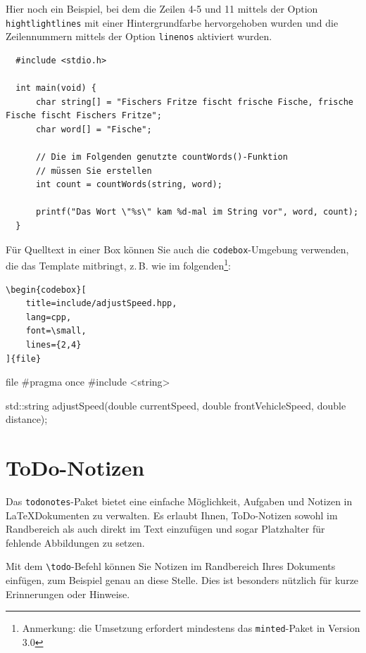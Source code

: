 Hier noch ein Beispiel, bei dem die Zeilen 4-5 und 11 mittels der Option
\texttt{hightlightlines} mit einer Hintergrundfarbe hervorgehoben wurden und die
Zeilennummern mittels der Option \texttt{linenos} aktiviert wurden.


\begin{verbatim}
  #include <stdio.h>
  
  int main(void) {
      char string[] = "Fischers Fritze fischt frische Fische, frische Fische fischt Fischers Fritze";
      char word[] = "Fische";
  
      // Die im Folgenden genutzte countWords()-Funktion
      // müssen Sie erstellen
      int count = countWords(string, word);
  
      printf("Das Wort \"%s\" kam %d-mal im String vor", word, count);
  }
\end{verbatim}

Für Quelltext in einer Box können Sie auch die \texttt{codebox}-Umgebung
verwenden, die das Template mitbringt, z.\,B. wie im
folgenden\footnote{Anmerkung: die Umsetzung erfordert mindestens das
\texttt{minted}-Paket in Version 3.0}:

\begin{verbatim}
\begin{codebox}[
    title=include/adjustSpeed.hpp,
    lang=cpp,
    font=\small,
    lines={2,4}
]{file}
\end{verbatim}

\begin{codebox}[title=\texttt{include/adjustSpeed.hpp}, lang=cpp, font=\small, lines={2,4}]{file}
#pragma once
#include <string>

std::string adjustSpeed(double currentSpeed,
                        double frontVehicleSpeed,
                        double distance);
\end{codebox}



\section{ToDo-Notizen}

Das \texttt{todonotes}-Paket bietet eine einfache Möglichkeit, Aufgaben und
Notizen in \LaTeX\-Dokumenten zu verwalten. Es erlaubt Ihnen, ToDo-Notizen
sowohl im Randbereich als auch direkt im Text einzufügen und sogar Platzhalter
für fehlende Abbildungen zu setzen.

Mit dem \texttt{\textbackslash todo}-Befehl können Sie Notizen im Randbereich
Ihres Dokuments einfügen, zum Beispiel genau an diese Stelle. Dies ist besonders nützlich für kurze Erinnerungen oder
Hinweise.

